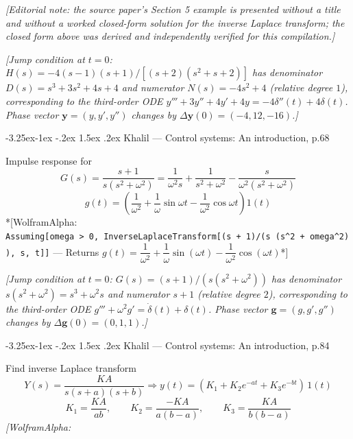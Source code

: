 \documentclass[
  11pt,
]{article}
\makeatletter
\providecommand{\implies}{\Longrightarrow}
\renewcommand\paragraph{\@startsection{paragraph}{4}{\z@}%
                                     {-3.25ex\@plus -1ex \@minus -.2ex}%
                                     {1.5ex \@plus .2ex}%
                                     {\normalfont\normalsize\bfseries}}
\makeatother
\begin{document}
\emph{{[}Editorial note: the source paper's Section 5 example is
presented without a title and without a worked closed-form solution for
the inverse Laplace transform; the closed form above was derived and
independently verified for this compilation.{]}}

\emph{{[}Jump condition at \(t=0\):
\(H(s)=-4(s-1)(s+1)/[(s+2)(s^2+s+2)]\) has denominator
\(D(s)=s^3+3s^2+4s+4\) and numerator \(N(s)=-4s^2+4\) (relative degree
\(1\)), corresponding to the third-order ODE
\(y'''+3y''+4y'+4y=-4\delta''(t)+4\delta(t)\). Phase vector
\(\mathbf y=(y,y',y'')\) changes by
\(\Delta\mathbf y(0)=(-4,12,-16)\).{]}}

\hypertarget{khalil-control-systems-an-introduction-p.68}{%
\paragraph{Khalil --- Control systems: An introduction,
p.68}\label{khalil-control-systems-an-introduction-p.68}}

Impulse response for \[
G(s) = \frac{s+1}{s(s^2+\omega^2)} = \frac{1}{\omega^2 s} + \frac{1}{s^2+\omega^2} - \frac{s}{\omega^2 (s^2+\omega^2)}
\] \[
g(t) = \left( \frac{1}{\omega^2} + \frac{1}{\omega} \sin \omega t - \frac{1}{\omega^2} \cos \omega t \right) 1(t)
\] *{[}WolframAlpha:
\texttt{Assuming{[}omega\ \textgreater{}\ 0,\ InverseLaplaceTransform{[}(s\ +\ 1)/(s\ (s\^{}2\ +\ omega\^{}2)),\ s,\ t{]}{]}}
--- Returns
\(g(t) = \dfrac{1}{\omega^2} + \dfrac{1}{\omega}\sin(\omega t) - \dfrac{1}{\omega^2}\cos(\omega t)\)*{]}

\emph{{[}Jump condition at \(t=0\): \(G(s)=(s+1)/(s(s^2+\omega^2))\) has
denominator \(s(s^2+\omega^2)=s^3+\omega^2 s\) and numerator \(s+1\)
(relative degree \(2\)), corresponding to the third-order ODE
\(g'''+\omega^2 g'=\dot\delta(t)+\delta(t)\). Phase vector
\(\mathbf g=(g,g',g'')\) changes by \(\Delta\mathbf g(0)=(0,1,1)\).{]}}

\hypertarget{khalil-control-systems-an-introduction-p.84}{%
\paragraph{Khalil --- Control systems: An introduction,
p.84}\label{khalil-control-systems-an-introduction-p.84}}

Find inverse Laplace transform \[
Y(s) = \frac{KA}{s(s+a)(s+b)} \implies y(t) = (K_1 + K_2 e^{-at} + K_3 e^{-bt})\,1(t)
\] \[
K_1 = \frac{KA}{ab},\qquad K_2 = \frac{-KA}{a(b-a)},\qquad K_3 = \frac{KA}{b(b-a)}
\] \emph{{[}WolframAlpha:}
\end{document}

